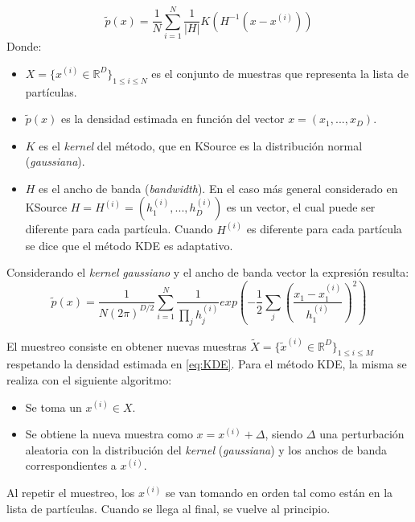 \begin{equation}
    \tilde{p}(x) = \frac{1}{N} \sum_{i=1}^N \frac{1}{|H|} K(H^{-1} (x-x^{(i)}))
    \label{eq:KDE}
\end{equation}
Donde:
\begin{itemize}
    \item $X = \{x^{(i)} \in \mathbb{R}^D\}_{1\leq i \leq N}$ es el conjunto de muestras que representa la lista de partículas.
    \item $\tilde{p}(x)$ es la densidad estimada en función del vector $x=(x_1,...,x_D)$.
    \item $K$ es el \emph{kernel} del método, que en KSource es la distribución normal (\emph{gaussiana}).
    \item $H$ es el ancho de banda (\emph{bandwidth}). En el caso más general considerado en KSource $H=H^{(i)}=(h_1^{(i)},...,h_D^{(i)})$ es un vector, el cual puede ser diferente para cada partícula. Cuando $H^{(i)}$ es diferente para cada partícula se dice que el método KDE es adaptativo.
\end{itemize}

Considerando el \emph{kernel} \emph{gaussiano} y el ancho de banda vector la expresión resulta:
\begin{equation}
    \label{eq:KDE-gauss}
    \tilde{p}(x) = \frac{1}{N (2\pi)^{D/2}} \sum_{i=1}^N \frac{1}{\prod_j h_j^{(i)}} exp\left(-\frac{1}{2} \sum_j \left(\frac{x_1-x_1^{(i)}}{h_1^{(i)}}\right)^2\right)
\end{equation}

El muestreo consiste en obtener nuevas muestras $\tilde{X} = \{\tilde{x}^{(i)} \in \mathbb{R}^D\}_{1\leq i \leq M}$ respetando la densidad estimada en \ref{eq:KDE}. Para el método KDE, la misma se realiza con el siguiente algoritmo:
\begin{itemize}
    \item Se toma un $x^{(i)} \in X$.
    \item Se obtiene la nueva muestra como $x = x^{(i)} + \Delta$, siendo $\Delta$ una perturbación aleatoria con la distribución del \emph{kernel} (\emph{gaussiana}) y los anchos de banda correspondientes a $x^{(i)}$.
\end{itemize}
Al repetir el muestreo, los $x^{(i)}$ se van tomando en orden tal como están en la lista de partículas. Cuando se llega al final, se vuelve al principio.


